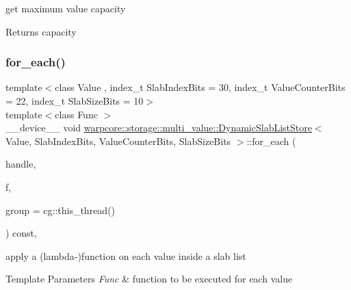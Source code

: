 get maximum value capacity 

\begin{DoxyReturn}{Returns}
capacity 
\end{DoxyReturn}
\mbox{\label{classwarpcore_1_1storage_1_1multi__value_1_1DynamicSlabListStore_a58a0c59ab8d635869043921c9ec85c21}} 
\subsubsection{\texorpdfstring{for\+\_\+each()}{for\_each()}}
{\footnotesize\ttfamily template$<$class Value , index\+\_\+t Slab\+Index\+Bits = 30, index\+\_\+t Value\+Counter\+Bits = 22, index\+\_\+t Slab\+Size\+Bits = 10$>$ \\
template$<$class Func $>$ \\
\+\_\+\+\_\+device\+\_\+\+\_\+ void \hyperlink{classwarpcore_1_1storage_1_1multi__value_1_1DynamicSlabListStore}{warpcore\+::storage\+::multi\+\_\+value\+::\+Dynamic\+Slab\+List\+Store}$<$ Value, Slab\+Index\+Bits, Value\+Counter\+Bits, Slab\+Size\+Bits $>$\+::for\+\_\+each (\begin{DoxyParamCaption}\item[{handle\+\_\+type}]{handle,  }\item[{Func}]{f,  }\item[{const cg\+::thread\+\_\+group \&}]{group = {\ttfamily cg\+:\+:this\+\_\+thread()} }\end{DoxyParamCaption}) const\hspace{0.3cm}{\ttfamily [inline]}, {\ttfamily [noexcept]}}



apply a (lambda-\/)function on each value inside a slab list 


\begin{DoxyTemplParams}{Template Parameters}
{\em Func} & function to be executed for each value \\
\hline
\end{DoxyTemplParams}

